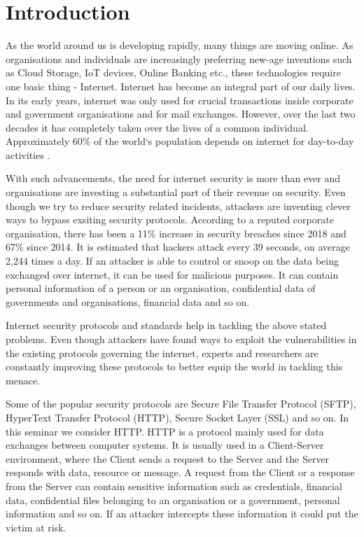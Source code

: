 \chapter{Introduction}

As the world around us is developing rapidly, many things are moving online. As organisations and individuals are increasingly preferring new-age inventions such as Cloud Storage, IoT devices, Online Banking etc., these technologies require one basic thing - Internet. Internet has become an integral part of our daily lives. In its early years, internet was only used for crucial transactions inside corporate and government organisations and for mail exchanges. However, over the last two decades it has completely taken over the lives of a common individual. Approximately 60\% of the world`s population depends on internet for day-to-day activities \cite{b16}. 

With such advancements, the need for internet security is more than ever and organisations are investing a substantial part of their revenue on security\cite{b2}. Even though we try to reduce security related incidents, attackers are inventing clever ways to bypass exsiting security protocols. According to a reputed corporate organisation, there has been a 11\% increase in security breaches since 2018 and 67\% since 2014\cite{b3}. It is estimated that hackers attack every 39 seconds, on average 2,244 times a day\cite{b4}. If an attacker is able to control or snoop on the data being exchanged over internet, it can be used for malicious purposes. It can contain personal information of a person or an organisation, confidential data of governments and organisations, financial data and so on.

Internet security protocols and standards help in tackling the above stated problems. Even though attackers have found ways to exploit the vulnerabilities in the existing protocols governing the internet, experts and researchers are constantly improving these protocols to better equip the world in tackling this menace.  

Some of the popular security protocols are Secure File Transfer Protocol (SFTP), HyperText Transfer Protocol (HTTP), Secure Socket Layer (SSL) and so on. In this seminar we consider HTTP. HTTP is a protocol mainly used for data exchanges between computer systems. It is usually used in a Client-Server environment, where the Client sends a request to the Server and the Server responds with data, resource or message. A request from the Client or a response from the Server can contain sensitive information such as credentials, financial data, confidential files belonging to an organisation or a government, personal information and so on. If an attacker intercepts these information it could put the victim at risk.  

